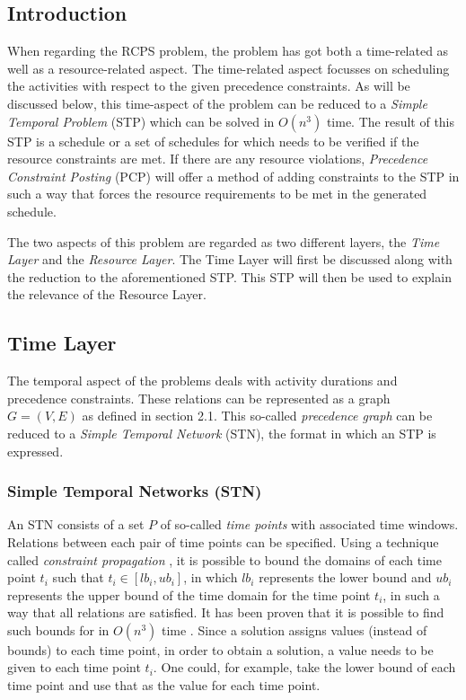 \documentclass{article}
\begin{document}
\subsection{Introduction}
When regarding the RCPS problem, the problem has got both a time-related as well as a resource-related aspect. 
The time-related aspect focusses on scheduling the activities with respect to the given precedence constraints. 
As will be discussed below, this time-aspect of the problem can be reduced to a \emph{Simple Temporal Problem} (STP) \cite{lombardi10} which can be solved in $O(n^3)$ time. 
The result of this STP is a schedule or a set of schedules for which needs to be verified if the resource constraints are met. 
If there are any resource violations, \emph{Precedence Constraint Posting} (PCP) will offer a method of adding constraints to the STP in such a way that forces the resource requirements to be met in the generated schedule. 

The two aspects of this problem are regarded as two different layers, the \emph{Time Layer} and the \emph{Resource Layer}.
The Time Layer will first be discussed along with the reduction to the aforementioned STP. 
This STP will then be used to explain the relevance of the Resource Layer.

\subsection{Time Layer}
The temporal aspect of the problems deals with activity durations and precedence constraints.
These relations can be represented as a graph $G=(V,E)$ as defined in section 2.1. 
This so-called \emph{precedence graph} can be reduced to a \emph{Simple Temporal Network} (STN), the format in which an STP is expressed.

\subsubsection{Simple Temporal Networks (STN)}
An STN consists of a set $P$ of so-called \emph{time points} with associated time windows.
Relations between each pair of time points can be specified.
Using a technique called \emph{constraint propagation} \cite{policella07}, it is possible to bound the domains of each time point $t_i$ such that $t_i \in [lb_i, ub_i]$, in which $lb_i$ represents the lower bound and $ub_i$ represents the upper bound of the time domain for the time point $t_i$, in such a way that all relations are satisfied.
It has been proven that it is possible to find such bounds for in $O(n^3)$ time \cite{policella07}.
Since a solution assigns values (instead of bounds) to each time point, in order to obtain a solution, a value needs to be given to each time point $t_i$.
One could, for example, take the lower bound of each time point and use that as the value for each time point.
\end{document}
